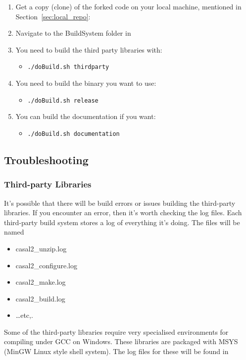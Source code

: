 \begin{enumerate}
	\item Get a copy (clone) of the forked code on your local machine, mentioned in Section~\ref{sec:local_repo}: 
	\item Navigate to the BuildSystem folder in 
	\item You need to build the third party libraries with:
	\begin{itemize}
	    \item \texttt{./doBuild.sh thirdparty}
	\end{itemize}
	\item You need to build the binary you want to use:
	\begin{itemize}
		\item \texttt{./doBuild.sh release}
	\end{itemize}	
	\item You can build the documentation if you want:
	\begin{itemize}
		\item \texttt{./doBuild.sh documentation}
	\end{itemize}		
\end{enumerate}

\subsection{Troubleshooting}

\subsubsection{Third-party Libraries}

It's possible that there will be build errors or issues building the third-party libraries. If you encounter an error, then it’s worth checking the log files. Each third-party build system stores a log of everything it’s doing. The files will be named

\begin{itemize}
	\item casal2\_unzip.log
	\item casal2\_configure.log
	\item casal2\_make.log
	\item casal2\_build.log
	\item \dots etc,.
\end{itemize}

Some of the third-party libraries require very specialised environments for compiling under GCC on Windows. These libraries are packaged with MSYS (MinGW Linux style shell system). The log files for these will be found in 

